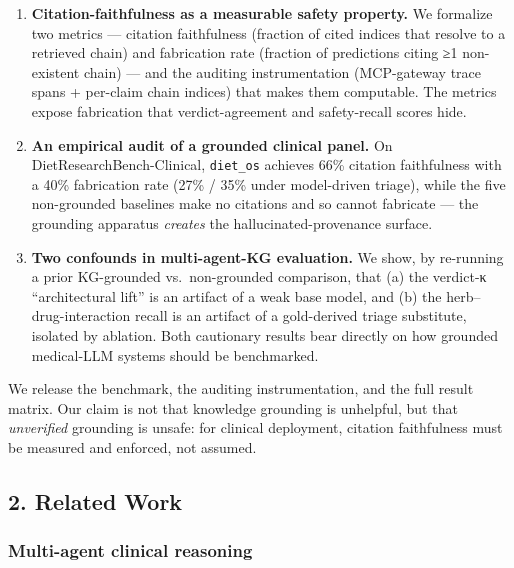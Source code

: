 \documentclass[
]{article}
\begin{document}
\begin{enumerate}
\def\labelenumi{\arabic{enumi}.}
\item
  \textbf{Citation-faithfulness as a measurable safety property.} We
  formalize two metrics --- citation faithfulness (fraction of cited
  indices that resolve to a retrieved chain) and fabrication rate
  (fraction of predictions citing ≥1 non-existent chain) --- and the
  auditing instrumentation (MCP-gateway trace spans + per-claim chain
  indices) that makes them computable. The metrics expose fabrication
  that verdict-agreement and safety-recall scores hide.
\item
  \textbf{An empirical audit of a grounded clinical panel.} On
  DietResearchBench-Clinical, \texttt{diet\_os} achieves 66\% citation
  faithfulness with a 40\% fabrication rate (27\% / 35\% under
  model-driven triage), while the five non-grounded baselines make no
  citations and so cannot fabricate --- the grounding apparatus
  \emph{creates} the hallucinated-provenance surface.
\item
  \textbf{Two confounds in multi-agent-KG evaluation.} We show, by
  re-running a prior KG-grounded vs.~non-grounded comparison, that (a)
  the verdict-κ ``architectural lift'' is an artifact of a weak base
  model, and (b) the herb--drug-interaction recall is an artifact of a
  gold-derived triage substitute, isolated by ablation. Both cautionary
  results bear directly on how grounded medical-LLM systems should be
  benchmarked.
\end{enumerate}

We release the benchmark, the auditing instrumentation, and the full
result matrix. Our claim is not that knowledge grounding is unhelpful,
but that \emph{unverified} grounding is unsafe: for clinical deployment,
citation faithfulness must be measured and enforced, not assumed.

\hypertarget{related-work}{%
\subsection{2. Related Work}\label{related-work}}

\hypertarget{multi-agent-clinical-reasoning}{%
\subsubsection{Multi-agent clinical
reasoning}\label{multi-agent-clinical-reasoning}}
\end{document}
